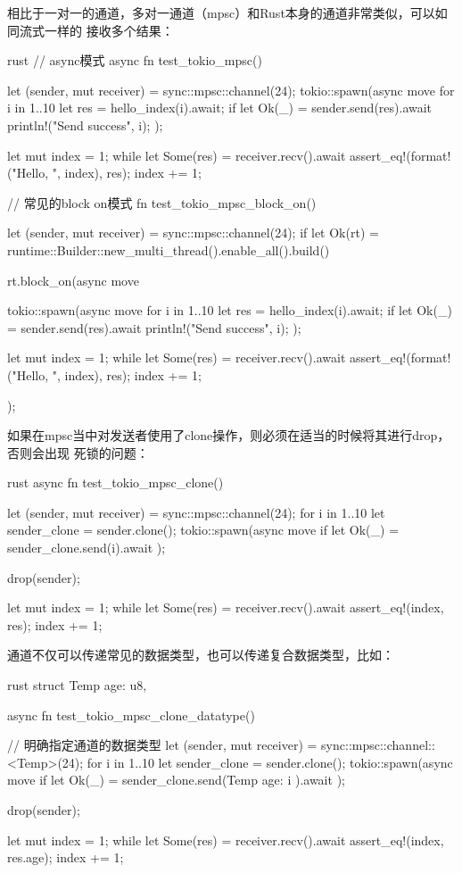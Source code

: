 相比于一对一的通道，多对一通道（mpsc）和Rust本身的通道非常类似，可以如同流式一样的
接收多个结果：
\begin{code-block}{rust}
// async模式
async fn test_tokio_mpsc() {
    let (sender, mut receiver) = sync::mpsc::channel(24);
    tokio::spawn(async move {
        for i in 1..10 {
            let res = hello_index(i).await;
            if let Ok(_) = sender.send(res).await {
                println!("Send {} success", i);
            }
        }
    });

    let mut index = 1;
    while let Some(res) = receiver.recv().await {
        assert_eq!(format!("Hello, {}", index), res);
        index += 1;
    }
}

// 常见的block on模式
fn test_tokio_mpsc_block_on() {
    let (sender, mut receiver) = sync::mpsc::channel(24);
    if let Ok(rt) = runtime::Builder::new_multi_thread().enable_all().build() {
        rt.block_on(async move {
            tokio::spawn(async move {
                for i in 1..10 {
                    let res = hello_index(i).await;
                    if let Ok(_) = sender.send(res).await {
                        println!("Send {} success", i);
                    }
                }
            });

            let mut index = 1;
            while let Some(res) = receiver.recv().await {
                assert_eq!(format!("Hello, {}", index), res);
                index += 1;
            }
        });
    }
}
\end{code-block}

如果在mpsc当中对发送者使用了clone操作，则必须在适当的时候将其进行drop，否则会出现
死锁的问题：
\begin{code-block}{rust}
async fn test_tokio_mpsc_clone() {
    let (sender, mut receiver) = sync::mpsc::channel(24);
    for i in 1..10 {
        let sender_clone = sender.clone();
        tokio::spawn(async move { if let Ok(_) = sender_clone.send(i).await {} });
    }

    drop(sender);

    let mut index = 1;
    while let Some(res) = receiver.recv().await {
        assert_eq!(index, res);
        index += 1;
    }
}
\end{code-block}

通道不仅可以传递常见的数据类型，也可以传递复合数据类型，比如：
\begin{code-block}{rust}
struct Temp {
    age: u8,
}

async fn test_tokio_mpsc_clone_datatype() {
    // 明确指定通道的数据类型
    let (sender, mut receiver) = sync::mpsc::channel::<Temp>(24);
    for i in 1..10 {
        let sender_clone = sender.clone();
        tokio::spawn(async move {
            if let Ok(_) = sender_clone.send(Temp { age: i }).await {}
        });
    }

    drop(sender);

    let mut index = 1;
    while let Some(res) = receiver.recv().await {
        assert_eq!(index, res.age);
        index += 1;
    }
}
\end{code-block}

